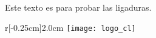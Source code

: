 

Este texto es para probar las ligaduras.

\begin{wrapfigure}[5]{r}[-0.25cm]{2.0cm}
	\vspace{-0.5\baselineskip}
	\texttt{[image: logo\_cl]}
\end{wrapfigure}

\Blindtext

